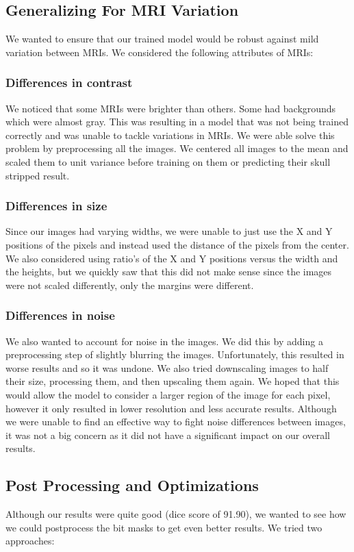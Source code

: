 \documentclass[letterpaper, 10 pt, conference]{ieeeconf}
\begin{document}
\subsection{Generalizing For MRI Variation}
We wanted to ensure that our trained model would be robust against mild variation between MRIs. We considered the following attributes of MRIs: 
\subsubsection{Differences in contrast}
We noticed that some MRIs were brighter than others. Some had backgrounds which were almost gray. This was resulting in a model that was not being trained correctly and was unable to tackle variations in MRIs. We were able solve this problem by preprocessing all the images. We centered all images to the mean and scaled them to unit variance before training on them or predicting their skull stripped result.
\subsubsection{Differences in size}
Since our images had varying widths, we were unable to just use the X and Y positions of the pixels and instead used the distance of the pixels from the center. We also considered using ratio's of the X and Y positions versus the width and the heights, but we quickly saw that this did not make sense since the images were not scaled differently, only the margins were different.
\subsubsection{Differences in noise}
We also wanted to account for noise in the images. We did this by adding a preprocessing step of slightly blurring the images. Unfortunately, this resulted in worse results and so it was undone. We also tried downscaling images to half their size, processing them, and then upscaling them again. We hoped that this would allow the model to consider a larger region of the image for each pixel, however it only resulted in lower resolution and less accurate results. Although we were unable to find an effective way to fight noise differences between images, it was not a big concern as it did not have a significant impact on our overall results.

\subsection{Post Processing and Optimizations}
Although our results were quite good (dice score of 91.90), we wanted to see how we could postprocess the bit masks to get even better results. We tried two approaches:
\end{document}
